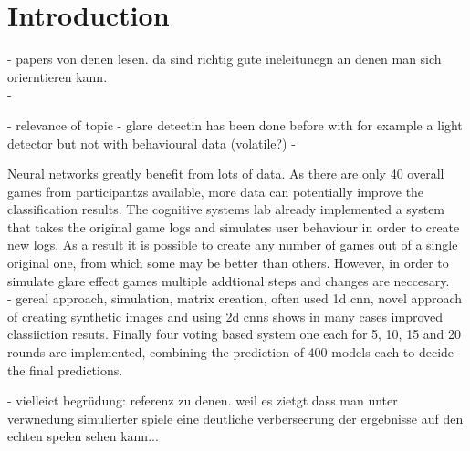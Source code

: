 \chapter{Introduction}
\label{introduction}



- papers von denen lesen. da sind richtig gute ineleitunegn an denen man sich orierntieren kann. \\
- 


- relevance of topic
- glare detectin has been done before with for example a light detector but not with behavioural data (volatile?) 
- 

Neural networks greatly benefit from lots of data. As there are only 40  overall games from participantzs available, more data can potentially improve the classification results.  The cognitive systems lab already implemented a system that takes the original game logs and simulates user behaviour in order to create new logs. As a result it is possible to create any number of games out of a single original one, from which some may be better than others. However, in order to simulate glare effect games multiple addtional steps and changes are neccesary. \\

- gereal approach, simulation, matrix creation, often used 1d cnn, novel approach of creating synthetic images and using 2d cnns shows in many cases improved classiiction resuts. 
Finally four voting based system one each for 5, 10, 15 and 20 rounds are implemented, combining the prediction of 400 models each to decide the final predictions.

- vielleict begrüdung: referenz zu denen. weil es zietgt dass man unter verwnedung simulierter spiele eine deutliche verberseerung der ergebnisse auf den echten spelen sehen kann...\\

